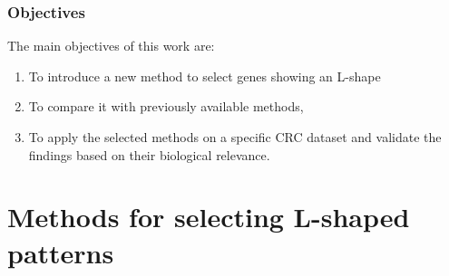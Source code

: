 \documentclass[handout]{beamer}
\begin{document}
\begin{frame}
	\frametitle{Objectives}
	
The main objectives of this work are:
\begin{enumerate}
	
	\item To introduce a new method to select genes showing an L-shape
	\item To compare it with previously available methods, 
	\item To apply the selected methods on a specific CRC dataset and validate the findings based on their biological relevance.
	
\end{enumerate}

\end{frame}

\section{Methods for selecting L-shaped patterns}
\end{document}
